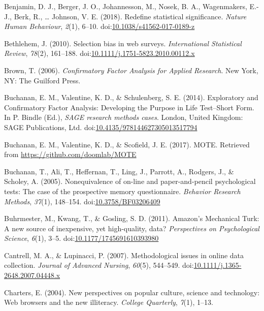 \documentclass[english,man, mask]{apa6}
\theoremstyle{definition}
\theoremstyle{definition}
\theoremstyle{definition}
\theoremstyle{remark}
\begin{document}
\hypertarget{ref-Benjamin2017}{}
Benjamin, D. J., Berger, J. O., Johannesson, M., Nosek, B. A.,
Wagenmakers, E.-J., Berk, R., \ldots{} Johnson, V. E. (2018). Redefine
statistical significance. \emph{Nature Human Behaviour}, \emph{2}(1),
6--10.
doi:\href{https://doi.org/10.1038/s41562-017-0189-z}{10.1038/s41562-017-0189-z}

\hypertarget{ref-Bethlehem2010}{}
Bethlehem, J. (2010). Selection bias in web surveys. \emph{International
Statistical Review}, \emph{78}(2), 161--188.
doi:\href{https://doi.org/10.1111/j.1751-5823.2010.00112.x}{10.1111/j.1751-5823.2010.00112.x}

\hypertarget{ref-Brown2006}{}
Brown, T. (2006). \emph{Confirmatory Factor Analysis for Applied
Research}. New York, NY: The Guilford Press.

\hypertarget{ref-Buchanan2014}{}
Buchanan, E. M., Valentine, K. D., \& Schulenberg, S. E. (2014).
Exploratory and Confirmatory Factor Analysis: Developing the Purpose in
Life Test--Short Form. In P. Bindle (Ed.), \emph{SAGE research methods
cases}. London, United Kingdom: SAGE Publications, Ltd.
doi:\href{https://doi.org/10.4135/978144627305013517794}{10.4135/978144627305013517794}

\hypertarget{ref-Buchanan2017}{}
Buchanan, E. M., Valentine, K. D., \& Scofield, J. E. (2017). MOTE.
Retrieved from \url{https://github.com/doomlab/MOTE}

\hypertarget{ref-Buchanan2005}{}
Buchanan, T., Ali, T., Heffernan, T., Ling, J., Parrott, A., Rodgers,
J., \& Scholey, A. (2005). Nonequivalence of on-line and
paper-and-pencil psychological tests: The case of the prospective memory
questionnaire. \emph{Behavior Research Methods}, \emph{37}(1), 148--154.
doi:\href{https://doi.org/10.3758/BF03206409}{10.3758/BF03206409}

\hypertarget{ref-Buhrmester2011}{}
Buhrmester, M., Kwang, T., \& Gosling, S. D. (2011). Amazon's Mechanical
Turk: A new source of inexpensive, yet high-quality, data?
\emph{Perspectives on Psychological Science}, \emph{6}(1), 3--5.
doi:\href{https://doi.org/10.1177/1745691610393980}{10.1177/1745691610393980}

\hypertarget{ref-Cantrell2007}{}
Cantrell, M. A., \& Lupinacci, P. (2007). Methodological issues in
online data collection. \emph{Journal of Advanced Nursing},
\emph{60}(5), 544--549.
doi:\href{https://doi.org/10.1111/j.1365-2648.2007.04448.x}{10.1111/j.1365-2648.2007.04448.x}

\hypertarget{ref-Charters2004}{}
Charters, E. (2004). New perspectives on popular culture, science and
technology: Web browsers and the new illiteracy. \emph{College
Quarterly}, \emph{7}(1), 1--13.
\end{document}
